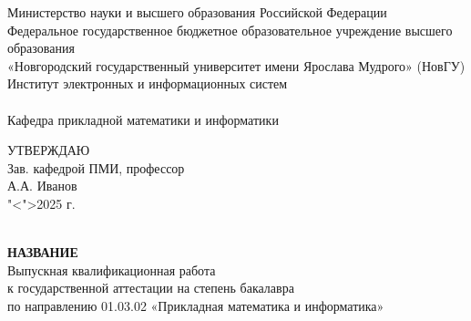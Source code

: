 
\begin{titlepage}
\begin{center}

Министерство науки и высшего образования Российской Федерации
\\
Федеральное государственное бюджетное образовательное учреждение 
высшего образования
\\
«Новгородский государственный университет имени Ярослава Мудрого» (НовГУ)
\\
Институт электронных и информационных систем
\\
\tiny\underline{\hspace{16cm}}
\\
\normalsize \lsstyle Кафедра прикладной математики и информатики
\\
\end{center}

\begin{flushright}
\begin{minipage}[t]{0.45\textwidth}
{\hspace*{\fill}УТВЕРЖДАЮ}
\\
\hspace*{\fill}Зав. кафедрой ПМИ, профессор
\\
\hspace*{\fill}\underline{\hspace{28mm}} А.А. Иванов
\\
\hspace*{\fill}"<\underline{\hspace{7mm}}">\underline{\hspace{35mm}}2025 г.
\\
\hfill \break
\\
\hfill \break
\end{minipage}
\end{flushright}

\begin{center}
    
\textbf{НАЗВАНИЕ}
\\
Выпускная квалификационная работа
\\
к государственной аттестации на степень бакалавра 
\\
по направлению 01.03.02 «Прикладная математика и информатика»
\\
\hfill \break
\hfill \break
\end{center}


\end{titlepage}
